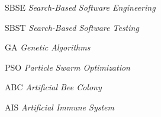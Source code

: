 \begin{siglas}
  \item[SBSE] \textit{Search-Based Software Engineering}
  \item[SBST] \textit{Search-Based Software Testing}
  \item[GA] \textit{Genetic Algorithms}
  \item[PSO] \textit{Particle Swarm Optimization}
  \item[ABC] \textit{Artificial Bee Colony}
  \item[AIS] \textit{Artificial Immune System}
\end{siglas}
